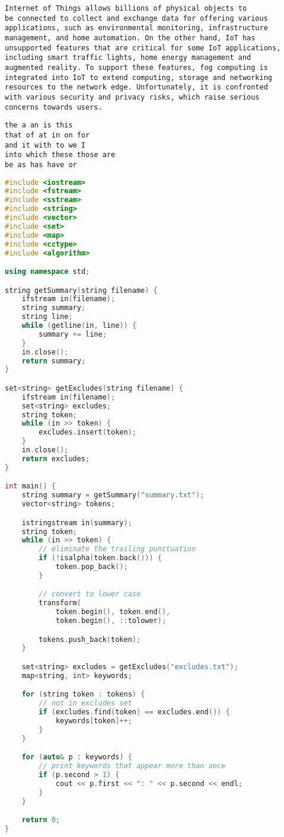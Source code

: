 \begin{lstlisting}[title=summary.txt, breaklines=true, breakatwhitespace=false]
Internet of Things allows billions of physical objects to 
be connected to collect and exchange data for offering various 
applications, such as environmental monitoring, infrastructure 
management, and home automation. On the other hand, IoT has 
unsupported features that are critical for some IoT applications, 
including smart traffic lights, home energy management and 
augmented reality. To support these features, fog computing is 
integrated into IoT to extend computing, storage and networking 
resources to the network edge. Unfortunately, it is confronted 
with various security and privacy risks, which raise serious 
concerns towards users.
\end{lstlisting}

\begin{lstlisting}[title=excludes.txt]
the a an is this
that of at in on for
and it with to we I
into which these those are
be as has have or
\end{lstlisting}

\begin{lstlisting}[language=C++, title=STL\_set\_map.cpp]
#include <iostream>
#include <fstream>
#include <sstream>
#include <string>
#include <vector>
#include <set>
#include <map>
#include <cctype>
#include <algorithm>

using namespace std;

string getSummary(string filename) {
	ifstream in(filename);
	string summary;
	string line;
	while (getline(in, line)) {
		summary += line;
	}
	in.close();
	return summary;
}

set<string> getExcludes(string filename) {
	ifstream in(filename);
	set<string> excludes;
	string token;
	while (in >> token) {
		excludes.insert(token);
	}
	in.close();
	return excludes;
}

int main() {
	string summary = getSummary("summary.txt");
	vector<string> tokens;

	istringstream in(summary);
	string token;
	while (in >> token) {
		// eliminate the trailing punctuation
		if (!isalpha(token.back())) {
			token.pop_back();
		}

		// convert to lower case
		transform(
			token.begin(), token.end(),
			token.begin(), ::tolower);

		tokens.push_back(token);
	}

	set<string> excludes = getExcludes("excludes.txt");
	map<string, int> keywords;

	for (string token : tokens) {
		// not in excludes set
		if (excludes.find(token) == excludes.end()) {
			keywords[token]++;
		}
	}

	for (auto& p : keywords) {
		// print keywords that appear more than once
		if (p.second > 1) {
			cout << p.first << ": " << p.second << endl;
		}
	}

	return 0;
}
\end{lstlisting}

